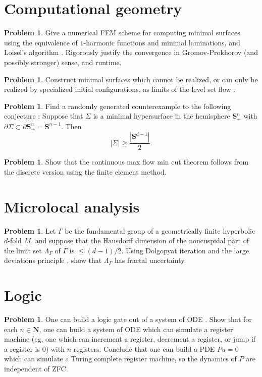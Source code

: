 \documentclass[reqno,11pt]{amsart}
\newcommand{\NN}{\mathbf{N}}
\newcommand{\Sph}{\mathbf S}
\theoremstyle{definition}
\newtheorem{problem}[theorem]{Problem}
\numberwithin{equation}{section}
\begin{document}
\section{Computational geometry}
\begin{problem}
Give a numerical FEM scheme for computing minimal surfaces using the equivalence of $1$-harmonic functions and minimal laminations, and Loisel's algorithm \cite{Loisel20}.
Rigorously justify the convergence in Gromov-Prokhorov (and possibly stronger) sense, and runtime.
\end{problem}

\begin{problem}
Construct minimal surfaces which cannot be realized, or can only be realized by specialized initial configurations, as limits of the level set flow \cite{CHOPP199377}.
\end{problem}

\begin{problem}
Find a randomly generated counterexample to the following conjecture \cite[Conjecture 5.3]{naff2022prescribed}:
Suppose that $\Sigma$ is a minimal hypersurface in the hemisphere $\Sph^n_+$ with $\partial \Sigma \subset \partial \Sph^n_+ = \Sph^{n - 1}$.
Then
$$|\Sigma| \geq \frac{|\Sph^{d - 1}|}{2}.$$
\end{problem}

\begin{problem}
Show that the continuous max flow min cut theorem follows from the discrete version using the finite element method.
\end{problem}

\section{Microlocal analysis}
\begin{problem}
Let $\Gamma$ be the fundamental group of a geometrically finite hyperbolic $d$-fold $M$, and suppose that the Hausdorff dimension of the noncuspidal part of the limit set $\Lambda_\Gamma$ of $\Gamma$ is $\leq (d - 1)/2$.
Using Dolgopyat iteration and the large deviations principle \cite{Li_2022}, show that $\Lambda_\Gamma$ has fractal uncertainty.
\end{problem}


\section{Logic}
\begin{problem}
One can build a logic gate out of a system of ODE \cite{Tao16}.
Show that for each $n \in \NN$, one can build a system of ODE which can simulate a register machine (eg, one which can increment a register, decrement a register, or jump if a register is $0$) with $n$ registers.
Conclude that one can build a PDE $Pu = 0$ which can simulate a Turing complete register machine, so the dynamics of $P$ are independent of ZFC.
\end{problem}



\printbibliography
\end{document}
